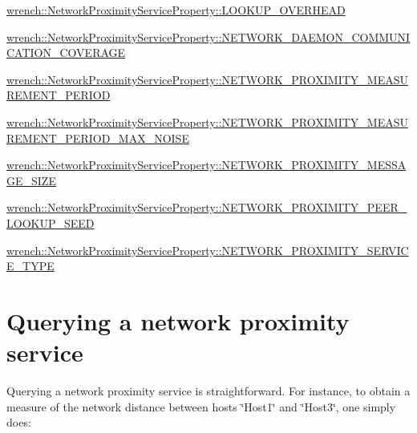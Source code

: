 \begin{DoxyItemize}
\item {\ttfamily \hyperlink{classwrench_1_1_network_proximity_service_property_a180718956b9f9b7bf040cc60dcef65f7}{wrench\+::\+Network\+Proximity\+Service\+Property\+::\+L\+O\+O\+K\+U\+P\+\_\+\+O\+V\+E\+R\+H\+E\+AD}}
\item {\ttfamily \hyperlink{classwrench_1_1_network_proximity_service_property_a19af22a3ba877db9832cd764de95d3d8}{wrench\+::\+Network\+Proximity\+Service\+Property\+::\+N\+E\+T\+W\+O\+R\+K\+\_\+\+D\+A\+E\+M\+O\+N\+\_\+\+C\+O\+M\+M\+U\+N\+I\+C\+A\+T\+I\+O\+N\+\_\+\+C\+O\+V\+E\+R\+A\+GE}}
\item {\ttfamily \hyperlink{classwrench_1_1_network_proximity_service_property_ae186f459f35a78e808d406f74483e418}{wrench\+::\+Network\+Proximity\+Service\+Property\+::\+N\+E\+T\+W\+O\+R\+K\+\_\+\+P\+R\+O\+X\+I\+M\+I\+T\+Y\+\_\+\+M\+E\+A\+S\+U\+R\+E\+M\+E\+N\+T\+\_\+\+P\+E\+R\+I\+OD}}
\item {\ttfamily \hyperlink{classwrench_1_1_network_proximity_service_property_a4a8f7599edf8a3983a0ff5ddfa3c8e2e}{wrench\+::\+Network\+Proximity\+Service\+Property\+::\+N\+E\+T\+W\+O\+R\+K\+\_\+\+P\+R\+O\+X\+I\+M\+I\+T\+Y\+\_\+\+M\+E\+A\+S\+U\+R\+E\+M\+E\+N\+T\+\_\+\+P\+E\+R\+I\+O\+D\+\_\+\+M\+A\+X\+\_\+\+N\+O\+I\+SE}}
\item {\ttfamily \hyperlink{classwrench_1_1_network_proximity_service_property_ad29e681b572ce963991844a75794e4c2}{wrench\+::\+Network\+Proximity\+Service\+Property\+::\+N\+E\+T\+W\+O\+R\+K\+\_\+\+P\+R\+O\+X\+I\+M\+I\+T\+Y\+\_\+\+M\+E\+S\+S\+A\+G\+E\+\_\+\+S\+I\+ZE}}
\item {\ttfamily \hyperlink{classwrench_1_1_network_proximity_service_property_a1c62b6bc5aef9b415d583aff4d44a892}{wrench\+::\+Network\+Proximity\+Service\+Property\+::\+N\+E\+T\+W\+O\+R\+K\+\_\+\+P\+R\+O\+X\+I\+M\+I\+T\+Y\+\_\+\+P\+E\+E\+R\+\_\+\+L\+O\+O\+K\+U\+P\+\_\+\+S\+E\+ED}}
\item {\ttfamily \hyperlink{classwrench_1_1_network_proximity_service_property_a4cb766dcd609012ab68000cfd9dc11b1}{wrench\+::\+Network\+Proximity\+Service\+Property\+::\+N\+E\+T\+W\+O\+R\+K\+\_\+\+P\+R\+O\+X\+I\+M\+I\+T\+Y\+\_\+\+S\+E\+R\+V\+I\+C\+E\+\_\+\+T\+Y\+PE}}
\end{DoxyItemize}\hypertarget{guide-networkproximity_guide-networkproximity-using}{}\section{Querying a network proximity service}\label{guide-networkproximity_guide-networkproximity-using}
Querying a network proximity service is straightforward. For instance, to obtain a measure of the network distance between hosts \char`\"{}\+Host1\char`\"{} and \char`\"{}\+Host3\char`\"{}, one simply does\+:



